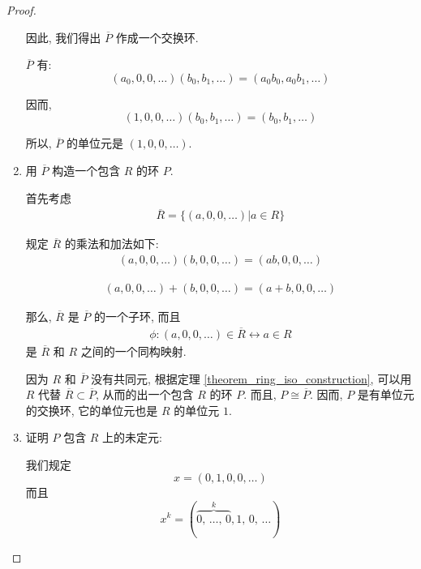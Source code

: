 \documentclass[utf8]{ctexbook}
\begin{document}
\begin{proof}
\begin{enumerate}
{因此, 我们得出 $\overline{P}$ 作成一个交换环.

$\overline{P}$ 有:
\begin{equation}
(a_0, 0, 0, \ldots) (b_0, b_1, \ldots) = (a_0 b_0, a_0 b_1, \ldots )
\end{equation}

因而, 
\begin{equation}
(1,0,0,\ldots) (b_0, b_1, \ldots) = (b_0, b_1, \ldots ) \nonumber
\end{equation}

所以, $\overline{P}$ 的单位元是 $(1, 0, 0, \ldots)$.

}
\item{用 $\overline{P}$ 构造一个包含 $R$ 的环 $P$.

首先考虑 
\begin{align*}
\overline{R} = \{ (a, 0, 0, \ldots) | a \in R \}
\end{align*}

规定 $\overline{R} $ 的乘法和加法如下:
\begin{align*}
(a, 0, 0, \ldots) (b, 0, 0, \ldots) = (ab, 0, 0, \ldots)
\end{align*}

\begin{align*}
(a, 0, 0, \ldots) + (b, 0, 0, \ldots) = (a + b, 0, 0, \ldots)
\end{align*}

那么, $\overline{R}$ 是 $\overline{P}$ 的一个子环, 而且
\begin{align*}
\phi : (a,0,0, \ldots) \in \overline{R} \longleftrightarrow a \in R 
\end{align*}
是 $\overline{R}$ 和 $R$ 之间的一个同构映射.

因为 $R$ 和 $\overline{P}$ 没有共同元, 根据定理 \ref{theorem_ring_iso_construction}, 可以用 $R$ 代替 $\overline{R} \subset \overline{P} $, 从而的出一个包含 $R$ 的环 $P$. 而且, $P \cong \overline{P}$. 因而, $P$ 是有单位元的交换环, 它的单位元也是 $R$ 的单位元 $1$.
}
\item{证明 $P$ 包含 $R$ 上的未定元:

我们规定
\begin{equation}
x = (0, 1, 0, 0, \ldots ) \nonumber
\end{equation}
而且
\begin{equation}
x^k = (  \overbrace{0, \, \ldots, \, 0}^{k}, 1, \, 0, \, \ldots ) \label{eq_xk_undeterminate_ring}
\end{equation}

}
\end{enumerate}
\end{proof}
\end{document}
